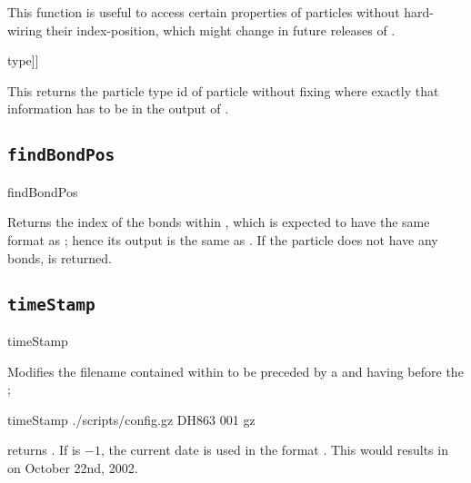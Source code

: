 This function is useful to access certain properties of particles
without hard-wiring their index-position, which might change in future
releases of .

\begin{tclcode}
[lindex [part $i] [findPropPos [part $i] type]]
\end{tclcode}
This returns the particle type id of particle  without fixing
where exactly that information has to be in the output of 
\codebox{[part \$i]}.

\subsection{\texttt{findBondPos}}
\begin{essyntax}
  findBondPos 
\end{essyntax}

Returns the index of the bonds within ,
which is expected to have the same format as ; hence its output is the same as
. If the
particle does not have any bonds,  is returned.

\subsection{\texttt{timeStamp}}
\begin{essyntax}
  timeStamp    
\end{essyntax}
Modifies the filename contained within  to be preceded by a
 and having  before the ; \eg
\begin{tclcode}
  timeStamp ./scripts/config.gz DH863 001 gz
\end{tclcode}
returns .  If  is $-1$,
the current date is used in the format . This would
results in  on October 22nd,
2002.

